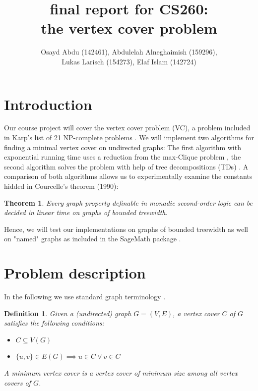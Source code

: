\documentclass[11pt,a4paper]{article}
\title{final report for CS260: \\ \normalsize the vertex cover problem}
\author{Osayd Abdu (142461), Abdulelah Alneghaimish (159296), \\ Lukas Larisch (154273), Elaf Islam (142724)}
\date{}
\newtheorem*{definition}{Definition}
\newtheorem*{theorem}{Theorem}
\begin{document}
\maketitle

\section{Introduction}

Our course project will cover the vertex cover problem (VC), a problem included in Karp's list of 21 NP-complete  problems \cite{karp, wiki}. We will implement two algorithms for finding a minimal vertex cover on undirected graphs: The first algorithm with exponential running time uses a reduction from the max-Clique problem \cite{Patric}, the second algorithm solves the problem with help of tree decompositions (TDs) \cite{survey, graphminor, arnborg}. A comparison of both algorithms allows us to experimentally examine the constants hidded in Courcelle's theorem (1990):

\begin{theorem}
Every graph property definable in monadic second-order logic can be decided in linear time on graphs of bounded treewidth.
\end{theorem}

Hence, we will test our implementations on graphs of bounded treewidth as well on "named" graphs as included in the SageMath package \cite{sage}.

\section{Problem description}

In the following we use standard graph terminology \cite{Diestel}.

\begin{definition}

Given a (undirected) graph $G = (V, E)$, a \emph{vertex cover} $C$ of $G$ satisfies the following conditions:

\begin{itemize}
\item $C \subseteq V(G)$ 
\item $\{u, v\} \in E(G) \implies u \in C \lor v \in C$ 
\end{itemize}

A \emph{minimum vertex cover} is a vertex cover of minimum size among all vertex covers of $G$.

\end{definition}
\end{document}
